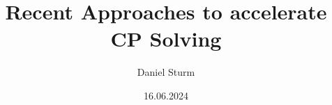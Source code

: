 
\def\languages{main=german,english}


\title{Recent Approaches to accelerate CP Solving}

\author{Daniel Sturm}






\date{16.06.2024}


